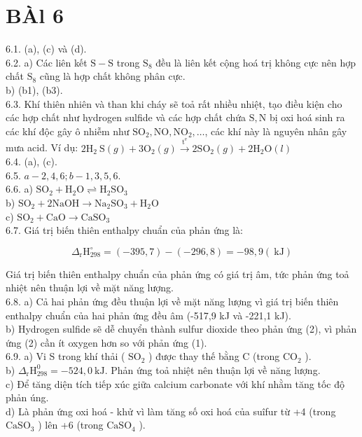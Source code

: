 \documentclass[10pt]{article}
\begin{document}
\section*{BÀl 6}
6.1. (a), (c) và (d).\\
6.2. a) Các liên kết $\mathrm{S}-\mathrm{S}$ trong $\mathrm{S}_{8}$ đều là liên kết cộng hoá trị không cực nên hợp chất $\mathrm{S}_{8}$ cũng là hợp chất không phân cực.\\
b) (b1), (b3).\\
6.3. Khí thiên nhiên và than khi cháy sẽ toả rất nhiều nhiệt, tạo điều kiện cho các hợp chất như hydrogen sulfide và các hợp chất chứa $\mathrm{S}, \mathrm{N}$ bị oxi hoá sinh ra các khí độc gây ô nhiễm như $\mathrm{SO}_{2}, \mathrm{NO}, \mathrm{NO}_{2}, \ldots$, các khí này là nguyên nhân gây mưa acid. Ví dụ: $2 \mathrm{H}_{2} \mathrm{~S}(g)+3 \mathrm{O}_{2}(g) \xrightarrow{\mathrm{t}^{\mathrm{e}}} 2 \mathrm{SO}_{2}(g)+2 \mathrm{H}_{2} \mathrm{O}(l)$\\
6.4. (a), (c).\\
6.5. $a-2,4,6 ; b-1,3,5,6$.\\
6.6. a) $\mathrm{SO}_{2}+\mathrm{H}_{2} \mathrm{O} \rightleftharpoons \mathrm{H}_{2} \mathrm{SO}_{3}$\\
b) $\mathrm{SO}_{2}+2 \mathrm{NaOH} \rightarrow \mathrm{Na}_{2} \mathrm{SO}_{3}+\mathrm{H}_{2} \mathrm{O}$\\
c) $\mathrm{SO}_{2}+\mathrm{CaO} \rightarrow \mathrm{CaSO}_{3}$\\
6.7. Giá trị biến thiên enthalpy chuẩn của phản ứng là:

$$
\Delta_{\mathrm{r}} \mathrm{H}_{298}^{\circ}=(-395,7)-(-296,8)=-98,9(\mathrm{~kJ})
$$

Giá trị biến thiên enthalpy chuẩn của phản ứng có giá trị âm, tức phản ứng toả nhiệt nên thuận lợi về mặt năng lượng.\\
6.8. a) Cả hai phản ứng đều thuận lợi về mặt năng lượng vì giá trị biến thiên enthalpy chuẩn của hai phản ứng đều âm (-517,9 kJ và -221,1 kJ).\\
b) Hydrogen sulfide sẽ dễ chuyển thành sulfur dioxide theo phản ứng (2), vì phản ứng (2) cần ít oxygen hơn so với phản ứng (1).\\
6.9. a) Vi S trong khí thải ( $\mathrm{SO}_{2}$ ) được thay thế bằng C (trong $\mathrm{CO}_{2}$ ).\\
b) $\Delta_{\mathrm{r}} \mathrm{H}_{298}^{0}=-524,0 \mathrm{~kJ}$. Phản ứng toả nhiệt nên thuận lợi về năng lượng.\\
c) Để tăng diện tích tiếp xúc giữa calcium carbonate với khí nhằm tăng tốc độ phản úng.\\
d) Là phản ứng oxi hoá - khử vì làm tăng số oxi hoá của suîfur từ +4 (trong $\mathrm{CaSO}_{3}$ ) lên +6 (trong $\mathrm{CaSO}_{4}$ ).
\end{document}
